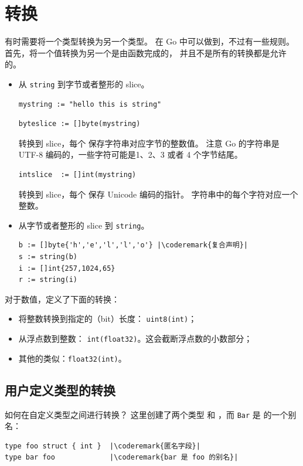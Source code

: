 \section{转换}
\label{sec:conversions}
有时需要将一个类型转换为另一个类型。
在 Go 中可以做到，不过有一些规则。首先，将一个值转换为另一个是由函数完成的，
并且不是所有的转换都是允许的。

\begin{table}[H]
\begin{center}
\caption[Valid conversions]{合法的转换， 
\lstinline{float64} 同 \lstinline{float32} 类似}
\label{tab:convesion}

\end{center}
\end{table}

\begin{itemize}
\item{
从 \lstinline{string} 到字节或者整形的 slice。
\begin{lstlisting}
mystring := "hello this is string"
\end{lstlisting}

\begin{lstlisting}
byteslice := []byte(mystring)
\end{lstlisting}
转换到  slice，每个  保存字符串对应字节的整数值。
注意 Go 的字符串是 UTF-8 编码的，一些字符可能是1、2、3 或者 4 个字节结尾。
\begin{lstlisting}
intslice  := []int(mystring)
\end{lstlisting}
转换到  slice，每个  保存 Unicode 编码的指针。
字符串中的每个字符对应一个整数。
}
\item{
从字节或者整形的 slice 到 \lstinline{string}。
\begin{lstlisting}
b := []byte{'h','e','l','l','o'} |\coderemark{复合声明}|
s := string(b)
i := []int{257,1024,65} 
r := string(i)
\end{lstlisting}
}
\end{itemize}
对于数值，定义了下面的转换：
\begin{itemize}
\item{将整数转换到指定的（bit）长度： 
\lstinline{uint8(int)}；}
\item{从浮点数到整数：
\lstinline{int(float32)}。这会截断浮点数的小数部分；}
\item{其他的类似：\lstinline{float32(int)}。}
\end{itemize}

\subsection{用户定义类型的转换}
如何在自定义类型之间进行转换？
这里创建了两个类型  和 ，而
\lstinline{Bar} 是  的一个别名：
\begin{lstlisting}
type foo struct { int }  |\coderemark{匿名字段}|
type bar foo             |\coderemark{bar 是 foo 的别名}|
\end{lstlisting}


